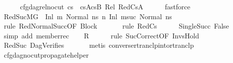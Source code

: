 \begin{isabellebody}
\ \ \ \ \isamarkupfalse%
\ cfg{\isacharunderscore}{\kern0pt}dag{\isacharunderscore}{\kern0pt}rel{\isacharunderscore}{\kern0pt}no{\isacharunderscore}{\kern0pt}cut\ {\isacartoucheopen}cs\ {\isacharequal}{\kern0pt}\ csA{\isacharat}{\kern0pt}csB{\isacartoucheclose}\ Rel{}\ RedCsA\isanewline
\ \ \ \ \isamarkupfalse%
\ fastforce\isanewline
\ \ \isamarkupfalse%
\ RedSuc{\isacharcolon}{\kern0pt}{\isachardoublequoteopen}M{\isacharcomma}{\kern0pt}{\isasymLambda}{\isacharcomma}{\kern0pt}{\isasymGamma}{\isacharcomma}{\kern0pt}{\isasymOmega}{\isacharcomma}{\kern0pt}G\ {\isasymturnstile}\ {\isacharparenleft}{\kern0pt}Inl\ m{\isacharcomma}{\kern0pt}\ Normal\ ns{}{\isacharparenright}{\kern0pt}\ {\isacharminus}{\kern0pt}n{\isasymrightarrow}\ {\isacharparenleft}{\kern0pt}Inl\ m{\isacharunderscore}{\kern0pt}suc{\isacharcomma}{\kern0pt}\ Normal\ ns{}{\isacharparenright}{\kern0pt}{\isachardoublequoteclose}\isanewline
\ \ \ \ \isamarkupfalse%
\ {\isacharparenleft}{\kern0pt}rule\ RedNormalSucc{\isacharbrackleft}{\kern0pt}OF\ Block{\isacharbrackright}{\kern0pt}{\isacharparenright}{\kern0pt}\isanewline
\ \ \ \ \ \isamarkupfalse%
\ {\isacharparenleft}{\kern0pt}rule\ RedCs{\isacharparenright}{\kern0pt}\isanewline
\ \ \ \ \isamarkupfalse%
\ SingleSucc\ False\isanewline
\ \ \ \ \isamarkupfalse%
\ {\isacharparenleft}{\kern0pt}simp\ add{\isacharcolon}{\kern0pt}\ member{\isacharunderscore}{\kern0pt}rec{\isacharparenleft}{\kern0pt}{}{\isacharparenright}{\kern0pt}{\isacharparenright}{\kern0pt}\isanewline
\ \ \isamarkupfalse%
\ R\isanewline
\ \ \ \ \isamarkupfalse%
\ {\isacharparenleft}{\kern0pt}rule\ SucCorrect{\isacharbrackleft}{\kern0pt}OF\ InvsHold{}{\isacharbrackright}{\kern0pt}{\isacharparenright}{\kern0pt}\isanewline
\ \ \ \ \isamarkupfalse%
\ RedSuc\ DagVerifies\ \isanewline
\ \ \ \ \isamarkupfalse%
\ {\isacharparenleft}{\kern0pt}metis\ converse{\isacharunderscore}{\kern0pt}rtranclp{\isacharunderscore}{\kern0pt}into{\isacharunderscore}{\kern0pt}rtranclp{\isacharparenright}{\kern0pt}\isanewline
\ \ \isamarkupfalse%
\isanewline
{}\isamarkupfalse%
%
\endisatagproof
{\isafoldproof}%
%
\isadelimproof
\isanewline
%
\endisadelimproof
\isanewline
{}\isamarkupfalse%
\ cfg{\isacharunderscore}{\kern0pt}dag{\isacharunderscore}{\kern0pt}no{\isacharunderscore}{\kern0pt}cut{\isacharunderscore}{\kern0pt}propagate{\isacharunderscore}{\kern0pt}helper{\isacharcolon}{\kern0pt}\isanewline

\end{isabellebody}
